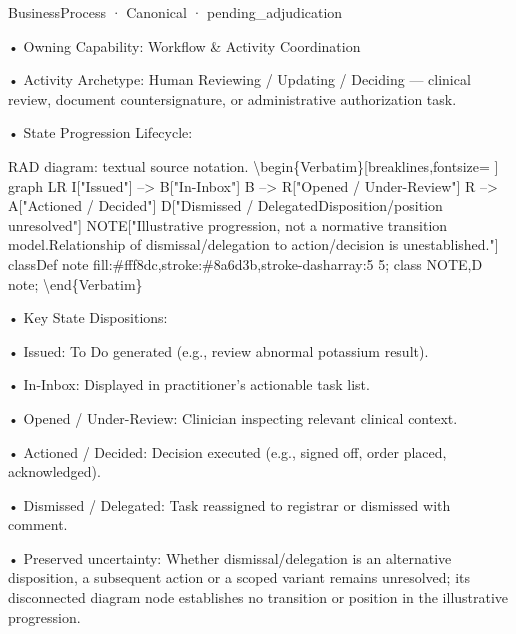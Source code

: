 \label{element:c5e4c3076b094c98a628179b91ae03d0}
{\small BusinessProcess · Canonical · pending\_adjudication}\par

•
Owning Capability: Workflow \& Activity Coordination



•
Activity Archetype: Human Reviewing / Updating / Deciding — clinical review, document countersignature, or administrative authorization task.



•
State Progression Lifecycle:



RAD diagram: textual source notation.
\textbackslash{}begin\{Verbatim\}[breaklines,fontsize=
]
graph LR
    I["Issued"] --> B["In-Inbox"]
    B --> R["Opened / Under-Review"]
    R --> A["Actioned / Decided"]
    D["Dismissed / Delegated\newline{}Disposition/position unresolved"]
    NOTE["Illustrative progression, not a normative transition model.\newline{}Relationship of dismissal/delegation to action/decision is unestablished."]
    classDef note fill:\#fff8dc,stroke:\#8a6d3b,stroke-dasharray:5 5;
    class NOTE,D note;
\textbackslash{}end\{Verbatim\}



•
Key State Dispositions:



•
Issued: To Do generated (e.g., review abnormal potassium result).



•
In-Inbox: Displayed in practitioner's actionable task list.



•
Opened / Under-Review: Clinician inspecting relevant clinical context.



•
Actioned / Decided: Decision executed (e.g., signed off, order placed, acknowledged).



•
Dismissed / Delegated: Task reassigned to registrar or dismissed with comment.



•
Preserved uncertainty: Whether dismissal/delegation is an alternative disposition, a subsequent action or a scoped variant remains unresolved; its disconnected diagram node establishes no transition or position in the illustrative progression.




